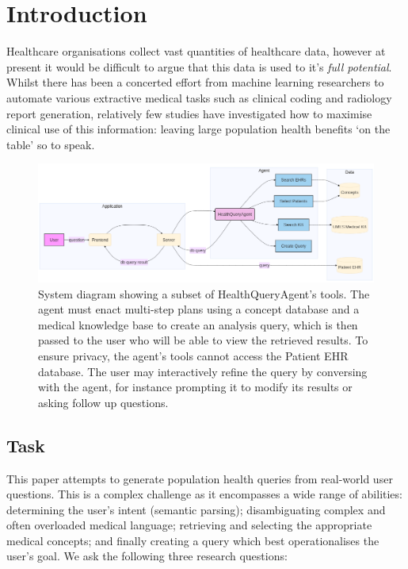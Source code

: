 \documentclass[11pt]{article}
\begin{document}
\section{Introduction}

Healthcare organisations collect vast quantities of healthcare data, however at present it would be difficult to argue that this data is used to it's \textit{full potential}. Whilst there has been a concerted effort from machine learning researchers to automate various extractive medical tasks such as clinical coding and radiology report generation, relatively few studies have investigated how to maximise clinical use of this information: leaving large population health benefits `on the table' so to speak.



\begin{figure}[t]
  \includegraphics[width=\linewidth]{content/system_diagram3.png}
	\caption{System diagram showing a subset of HealthQueryAgent's tools. The agent must enact multi-step plans using a concept database and a medical knowledge base to create an analysis query, which is then passed to the user who will be able to view the retrieved results. To ensure privacy, the agent's tools cannot access the Patient EHR database. The user may interactively refine the query by conversing with the agent, for instance prompting it to modify its results or asking follow up questions.}
	\label{fig:system-diagram}
\end{figure}


\subsection{Task}
This paper attempts to generate population health queries from real-world user questions.
This is a complex challenge as it encompasses a wide range of abilities: determining the user's intent (semantic parsing); disambiguating complex and often overloaded medical language; retrieving and selecting the appropriate medical concepts; and finally creating a query which best operationalises the user's goal.
We ask the following three research questions:
\end{document}

